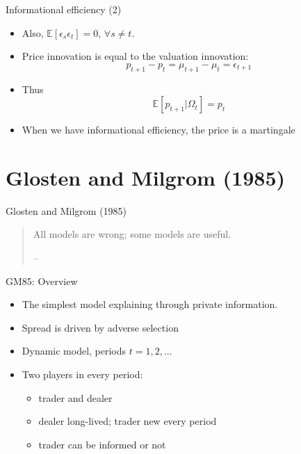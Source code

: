 \documentclass[english,10pt]{beamer}
\begin{document}
\begin{frame}{Informational efficiency (2)}
	\begin{itemize}
	 \item Also, $\mathbb{E}[\epsilon_{s}\epsilon_t]=0$, $\forall s \ne t$.
	\item Price innovation is equal to the valuation innovation:
	\[
	p_{t+1} - p_t = \mu_{t+1} - \mu_t = \epsilon_{t+1}
	\]
	\item Thus
	\[
	\mathbb{E}[p_{t+1}|\Omega_{t}] = p_t
	\]
	\item When we have informational efficiency, the price is a \alert{martingale}
\end{itemize}
\end{frame}



\section{Glosten and Milgrom (1985)}

\begin{frame}{Glosten and Milgrom (1985)}
	\begin{quotation}
		All models are wrong; some models are useful.
		\begin{flushright}
			-- 
		\end{flushright}
	\end{quotation}
\end{frame}


\begin{frame}{GM85: Overview}
	\begin{itemize}
		\item The simplest model explaining  through private information.
		\item Spread is driven by adverse selection
		\item Dynamic model, periods $t = 1,2,...$
		\item Two players in every period:
		\begin{itemize}
			\item trader and dealer
			\item dealer long-lived; trader new every period
			\item trader can be informed or not
		\end{itemize}
	\end{itemize}
\end{frame}
\end{document}
